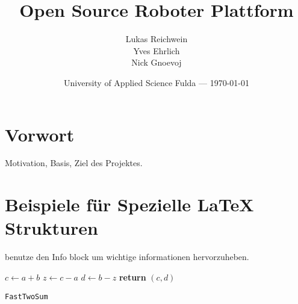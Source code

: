 \documentclass{article}
\title{Open Source Roboter Plattform} %
\author{Lukas Reichwein\\ Yves Ehrlich\\ Nick Gnoevoj}
\date{University of Applied Science Fulda --- \today} %
\begin{document}
\maketitle %
\tableofcontents %
\newpage


\section*{Vorwort} %

	Motivation, Basis, Ziel des Projektes.

\newpage
\section{Beispiele für Spezielle LaTeX Strukturen}

\begin{info} %
	benutze den Info block um wichtige informationen hervorzuheben.
\end{info}


\begin{center}
	\begin{minipage}{0.5\linewidth} %
		\begin{algorithm}[H]
			\medskip
			$c \leftarrow a + b$ \;
			$z \leftarrow c - a$ \;
			$d \leftarrow b - z$ \;
			{\bf return} $(c,d)$ \;
			\caption{\texttt{FastTwoSum}} %
			\label{alg:fastTwoSum}   %
		\end{algorithm}
	\end{minipage}
\end{center}
\end{document}
